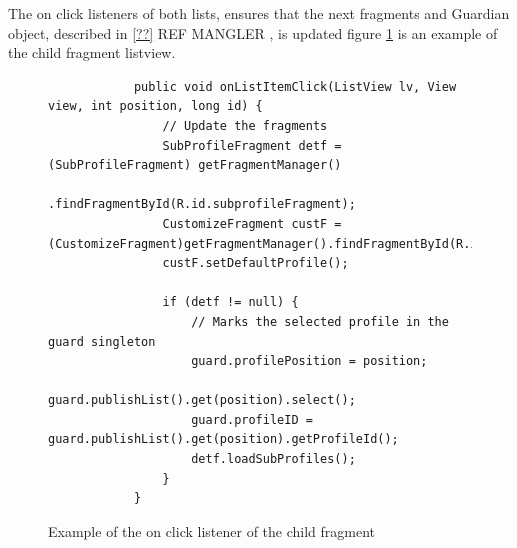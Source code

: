 The on click listeners of both lists, ensures that the next fragments and Guardian object, described in \ref{??}\color[rgb]{1,0.41,0.13} REF MANGLER \color[rgb]{0,0,0}, is updated figure \ref{code:listview_onclick_example} is an example of the child fragment listview.

\begin{figure}[H]%
		\begin{verbatim}
			public void onListItemClick(ListView lv, View view, int position, long id) {
				// Update the fragments
				SubProfileFragment detf = (SubProfileFragment) getFragmentManager()
						.findFragmentById(R.id.subprofileFragment);
				CustomizeFragment custF = (CustomizeFragment)getFragmentManager().findFragmentById(R.id.customizeFragment);
				custF.setDefaultProfile();
				
				if (detf != null) {
					// Marks the selected profile in the guard singleton
					guard.profilePosition = position; 
					guard.publishList().get(position).select();
					guard.profileID = guard.publishList().get(position).getProfileId();
					detf.loadSubProfiles();
				}
			}
		\end{verbatim}
	\caption{Example of the on click listener of the child fragment}%
	\label{code:listview_onclick_example}%
\end{figure}

